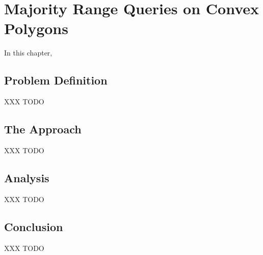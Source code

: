 \chapter{Majority Range Queries on Convex Polygons}
\label{:convexp}

In this chapter, 


\section{Problem Definition}
\label{:convexp:problem-definition}

XXX TODO

\section{The Approach}
\label{:convexp:approach}


XXX TODO

\section{Analysis}
\label{:convexp:analysis}

XXX TODO

\section{Conclusion}
\label{:convexp:concl}

XXX TODO
